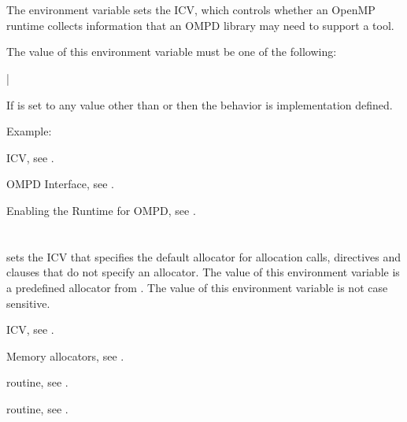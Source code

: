 \section{}
\label{sec:OMP_DEBUG}

The  environment variable sets the  ICV,
which controls whether an OpenMP runtime collects information that an
OMPD library may need to support a tool.

The value of this environment variable must be one of the following:

{|}

If  is set to any value other than 
or  then the behavior is implementation defined.

Example:
\begin{ompEnv}
\end{ompEnv}

\begin{crossrefs}
\item {} ICV,
see .

\item OMPD Interface, see .

\item Enabling the Runtime for OMPD, see .
\end{crossrefs}



\section{}
\label{sec:OMP_ALLOCATOR}

 sets the  ICV that specifies
the default allocator for allocation calls, directives and clauses that
do not specify an allocator. The value of this environment variable is a
predefined allocator from . The value
of this environment variable is not case sensitive.

\begin{crossrefs}
\item {} ICV, see .

\item Memory allocators, see .

\item {} routine,
see .

\item {} routine,
see .
\end{crossrefs}
